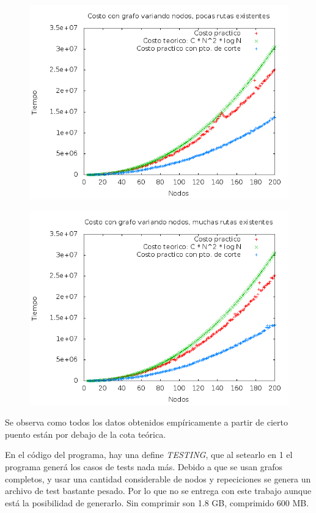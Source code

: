 \quad

\begin{figure}[H]
	\centering
	\includegraphics[scale=0.6]{ej2-grafico1.png}
\end{figure}


\begin{figure}[H]
	\centering
	\includegraphics[scale=0.6]{ej2-grafico2.png}
\end{figure}

\quad Se observa como todos los datos obtenidos emp\'iricamente a partir de cierto puento est\'an por debajo de la cota te\'orica. 

\quad

\quad En el c\'odigo del programa, hay una define \textit{TESTING}, que al setearlo en 1 el programa gener\'a los casos de tests nada más. Debido a que se usan grafos completos, y usar una cantidad considerable de nodos y repeciciones se genera un archivo de test bastante pesado. Por lo que no se entrega con este trabajo aunque est\'a la posibilidad de generarlo. Sin comprimir son 1.8 GB, comprimido 600 MB.

